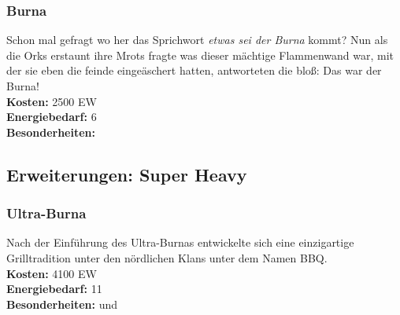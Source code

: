 \subsubsection*{Burna}
Schon mal gefragt wo her das Sprichwort \textit{etwas sei der Burna} kommt? Nun als die Orks erstaunt ihre Mrots fragte was dieser mächtige Flammenwand war, mit der sie eben die feinde eingeäschert hatten, antworteten die bloß: Das war der Burna! \\
\textbf{Kosten:} 2500 EW\\
\textbf{Energiebedarf:} 6 \\
\textbf{Besonderheiten:} \textit{}

\subsection*{Erweiterungen: Super Heavy}

\subsubsection*{Ultra-Burna}
Nach der Einführung des Ultra-Burnas entwickelte sich eine einzigartige Grilltradition unter den nördlichen Klans unter dem Namen BBQ. \\
\textbf{Kosten:} 4100 EW\\
\textbf{Energiebedarf:} 11 \\
\textbf{Besonderheiten:} \textit{} und \textit{}
